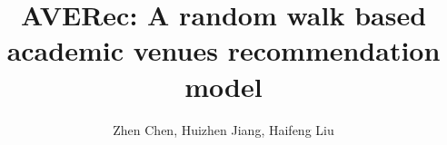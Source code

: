 \documentclass[9pt]{acm_proc_article-sp}
\begin{document}
\title{AVERec: A random walk based academic venues recommendation model}

\author{
\alignauthor
Zhen Chen, Huizhen Jiang, Haifeng Liu\\
       \\
}
\end{document}
